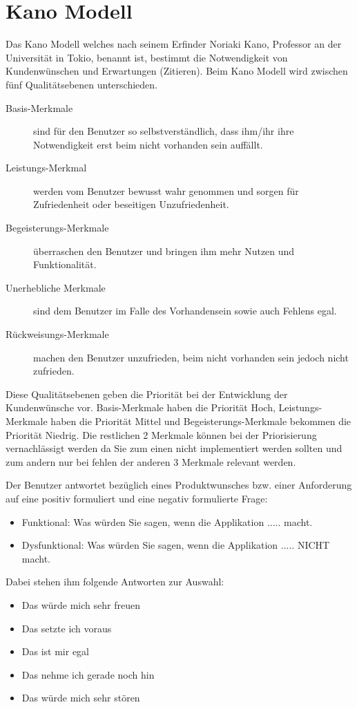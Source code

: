 \newpage{}
\section{Kano Modell}
\label{sec:kanomodel}
Das Kano Modell welches nach seinem Erfinder Noriaki Kano, Professor an der Universität in Tokio, benannt ist, bestimmt die Notwendigkeit von Kundenwünschen und Erwartungen (Zitieren). Beim Kano Modell wird zwischen fünf Qualitätsebenen unterschieden.

\begin{description}
  \item[Basis-Merkmale] sind für den Benutzer so selbstverständlich, dass ihm/ihr ihre Notwendigkeit erst beim nicht vorhanden sein auffällt.
  \item[Leistungs-Merkmal] werden vom Benutzer bewusst wahr genommen und sorgen für Zufriedenheit oder beseitigen Unzufriedenheit.
  \item[Begeisterungs-Merkmale] überraschen den Benutzer und bringen ihm mehr Nutzen und Funktionalität.
  \item[Unerhebliche Merkmale] sind dem Benutzer im Falle des Vorhandensein sowie auch Fehlens egal.
  \item[Rückweisungs-Merkmale] machen den Benutzer unzufrieden, beim nicht vorhanden sein jedoch nicht zufrieden.
\end{description}

Diese Qualitätsebenen geben die Priorität bei der Entwicklung der Kundenwünsche vor. Basis-Merkmale haben die Priorität Hoch, Leistungs-Merkmale haben die Priorität Mittel und Begeisterungs-Merkmale bekommen die Priorität Niedrig. Die restlichen 2 Merkmale können bei der Priorisierung vernachlässigt werden da Sie zum einen nicht implementiert werden sollten und zum andern nur bei fehlen der anderen 3 Merkmale relevant werden.

Der Benutzer antwortet bezüglich eines Produktwunsches bzw. einer Anforderung auf eine positiv formuliert und eine negativ formulierte Frage:
\begin{itemize}
  \item Funktional: Was würden Sie sagen, wenn die Applikation ..... macht.
  \item Dysfunktional: Was würden Sie sagen, wenn die Applikation ..... NICHT macht.
\end{itemize}

Dabei stehen ihm folgende Antworten zur Auswahl:

\begin{itemize}
  \item Das würde mich sehr freuen
  \item Das setzte ich voraus
  \item Das ist mir egal
  \item Das nehme ich gerade noch hin
  \item Das würde mich sehr stören
\end{itemize}

